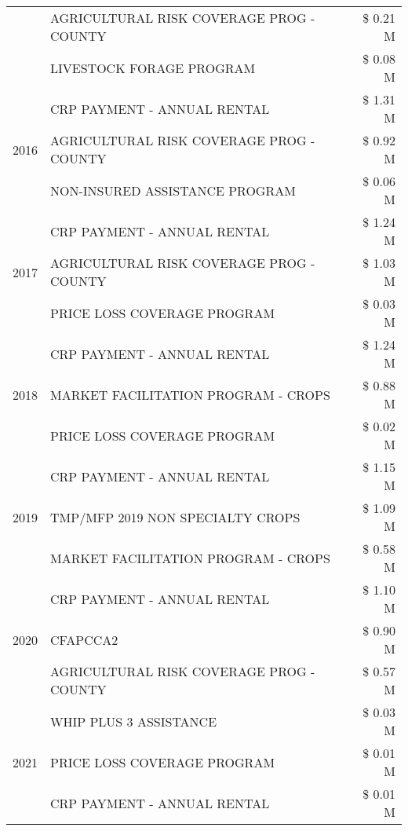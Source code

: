 \begin{tabular}{llr}
 & AGRICULTURAL RISK COVERAGE PROG - COUNTY & \$ 0.21 M \\
 & LIVESTOCK FORAGE PROGRAM & \$ 0.08 M \\
\cline{1-3}
\multirow[t]{3}{*}{2016} & CRP PAYMENT - ANNUAL RENTAL                   & \$ 1.31 M \\
 & AGRICULTURAL RISK COVERAGE PROG - COUNTY      & \$ 0.92 M \\
 & NON-INSURED ASSISTANCE PROGRAM                & \$ 0.06 M \\
\cline{1-3}
\multirow[t]{3}{*}{2017} & CRP PAYMENT - ANNUAL RENTAL & \$ 1.24 M \\
 & AGRICULTURAL RISK COVERAGE PROG - COUNTY & \$ 1.03 M \\
 & PRICE LOSS COVERAGE PROGRAM & \$ 0.03 M \\
\cline{1-3}
\multirow[t]{3}{*}{2018} & CRP PAYMENT - ANNUAL RENTAL & \$ 1.24 M \\
 & MARKET FACILITATION PROGRAM - CROPS & \$ 0.88 M \\
 & PRICE LOSS COVERAGE PROGRAM & \$ 0.02 M \\
\cline{1-3}
\multirow[t]{3}{*}{2019} & CRP PAYMENT - ANNUAL RENTAL & \$ 1.15 M \\
 & TMP/MFP 2019 NON SPECIALTY CROPS & \$ 1.09 M \\
 & MARKET FACILITATION PROGRAM - CROPS & \$ 0.58 M \\
\cline{1-3}
\multirow[t]{3}{*}{2020} & CRP PAYMENT - ANNUAL RENTAL & \$ 1.10 M \\
 & CFAPCCA2 & \$ 0.90 M \\
 & AGRICULTURAL RISK COVERAGE PROG - COUNTY & \$ 0.57 M \\
\cline{1-3}
\multirow[t]{3}{*}{2021} & WHIP PLUS 3 ASSISTANCE & \$ 0.03 M \\
 & PRICE LOSS COVERAGE PROGRAM & \$ 0.01 M \\
 & CRP PAYMENT - ANNUAL RENTAL & \$ 0.01 M \\
\cline{1-3}
\bottomrule
\end{tabular}
